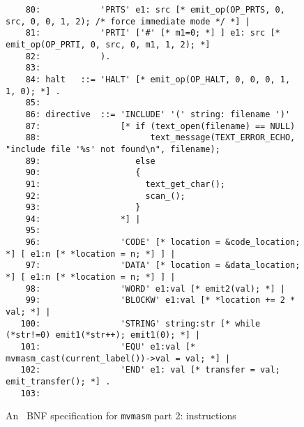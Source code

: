 \begin{figure}
\begin{minipage}{30cm}
\begin{verbatim}
    80:            'PRTS' e1: src [* emit_op(OP_PRTS, 0, src, 0, 0, 1, 2); /* force immediate mode */ *] |
    81:            'PRTI' ['#' [* m1=0; *] ] e1: src [* emit_op(OP_PRTI, 0, src, 0, m1, 1, 2); *]
    82:            ).
    83: 
    84: halt   ::= 'HALT' [* emit_op(OP_HALT, 0, 0, 0, 1, 1, 0); *] .
    85: 
    86: directive  ::= 'INCLUDE' '(' string: filename ')'
    87:                [* if (text_open(filename) == NULL)
    88:                      text_message(TEXT_ERROR_ECHO, "include file '%s' not found\n", filename);
    89:                   else
    90:                   {
    91:                     text_get_char();
    92:                     scan_();
    93:                   }
    94:                *] |
    95: 
    96:                'CODE' [* location = &code_location; *] [ e1:n [* *location = n; *] ] |
    97:                'DATA' [* location = &data_location; *] [ e1:n [* *location = n; *] ] |
    98:                'WORD' e1:val [* emit2(val); *] |
    99:                'BLOCKW' e1:val [* *location += 2 * val; *] |
   100:                'STRING' string:str [* while (*str!=0) emit1(*str++); emit1(0); *] |
   101:                'EQU' e1:val [* mvmasm_cast(current_label())->val = val; *] |
   102:                'END' e1: val [* transfer = val; emit_transfer(); *] .
   103: 
\end{verbatim}
\end{minipage}
\caption{An \rdp\ BNF specification for {\tt mvmasm} part 2: instructions}
\label{mvmasm:bnf2}
\end{figure}

